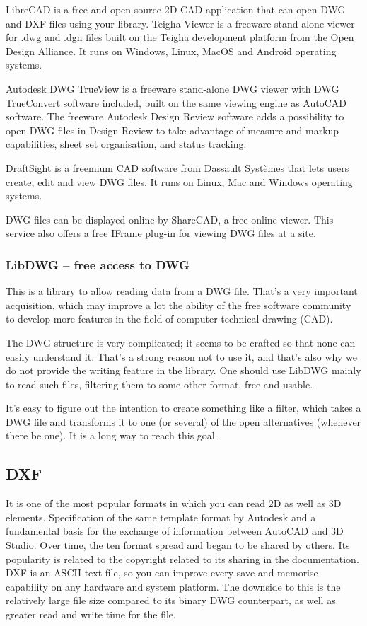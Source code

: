 \documentclass[a4paper, 11pt, article]{report}
\begin{document}
LibreCAD is a free and open-source 2D CAD application that can open DWG and DXF files using your library. Teigha Viewer is a freeware stand-alone viewer for .dwg and .dgn files built on the Teigha development platform from the Open Design Alliance. It runs on Windows, Linux, MacOS and Android operating systems.

Autodesk DWG TrueView is a freeware stand-alone DWG viewer with DWG TrueConvert software included, built on the same viewing engine as AutoCAD software. The freeware Autodesk Design Review software adds a possibility to open DWG files in Design Review to take advantage of measure and markup capabilities, sheet set organisation, and status tracking.

DraftSight is a freemium CAD software from Dassault Systèmes that lets users create, edit and view DWG files. It runs on Linux, Mac and Windows operating systems. 

DWG files can be displayed online by ShareCAD, a free online viewer. This service also offers a free IFrame plug-in for viewing DWG files at a site.

\subsubsection{LibDWG – free access to DWG}

This is a library to allow reading data from a DWG file. That's a very important acquisition, which may improve a lot the ability of the free software community to develop more features in the field of computer technical drawing (CAD).

The DWG structure is very complicated; it seems to be crafted so that none can easily understand it. That's a strong reason not to use it, and that's also why we do not provide the writing feature in the library. One should use LibDWG mainly to read such files, filtering them to some other format, free and usable.

It's easy to figure out the intention to create something like a filter, which takes a DWG file and transforms it to one (or several) of the open alternatives (whenever there be one). It is a long way to reach this goal.
  
\subsection{DXF}
   
It is one of the most popular formats in which you can read 2D as well as 3D elements. Specification of the same template format by Autodesk and a fundamental basis for the exchange of information between AutoCAD and 3D Studio. Over time, the ten format spread and began to be shared by others. Its popularity is related to the copyright related to its sharing in the documentation. DXF is an ASCII text file, so you can improve every save and memorise capability on any hardware and system platform. The downside to this is the relatively large file size compared to its binary DWG counterpart, as well as greater read and write time for the file.
   
\end{document}
